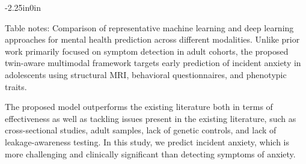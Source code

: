 \documentclass[10pt,letterpaper]{article}
\begin{document}
\begin{table}[!t]
\begin{adjustwidth}{-2.25in}{0in}
                                                                                                                          \begin{flushleft}
                                                                                                                          Table notes: Comparison of representative machine learning and deep learning
                                                                                                                          approaches for mental health prediction across different modalities.
                                                                                                                          Unlike prior work primarily focused on symptom detection in adult cohorts,
                                                                                                                          the proposed twin-aware multimodal framework targets early prediction of
                                                                                                                          incident anxiety in adolescents using structural MRI, behavioral
                                                                                                                          questionnaires, and phenotypic traits.
                                                                                                                          \end{flushleft}

                                                                                                                          \end{adjustwidth}
                                                                                                                          \end{table}

                                                                                                                          The proposed model outperforms the existing literature both in terms of effectiveness as well
as tackling issues present in the existing literature, such as cross-sectional studies, adult
samples, lack of genetic controls, and lack of leakage-awareness testing. In this study, we
predict incident anxiety, which is more challenging and clinically significant than detecting
symptoms of anxiety.
\end{document}
